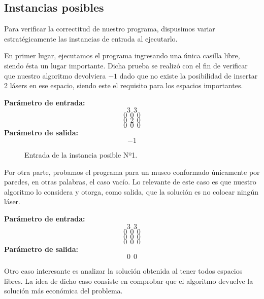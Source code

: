 \subsection{Instancias posibles}
Para verificar la correctitud de nuestro programa, dispusimos variar estratégicamente las instancias de entrada al ejecutarlo.
\begin{itemize}
\item En primer lugar, ejecutamos el programa ingresando una única casilla libre, siendo ésta un lugar importante. Dicha prueba se realizó con el fin de verificar que nuestro algoritmo devolviera $-1$ dado que no existe la posibilidad de insertar 2 lásers en ese espacio, siendo este el requisito para los espacios importantes.\newline

\textbf{Parámetro de entrada:} 
$$3\ \ 3$$
$$0\ \ 0\ \ 0$$
$$0\ \ 2\ \ 0$$
$$0\ \ 0\ \ 0$$
\textbf{Parámetro de salida:} $$-1$$\newline

\begin{center}
\begin{figure}[H] %
\begin{minipage}[t]{.45\textwidth}
\begin{center}
\caption{Entrada de la instancia posible Nº1.}
\end{center}
\label{fig-tc1}
\end{minipage}
\end{figure}
\item Por otra parte, probamos el programa para un museo conformado únicamente por paredes, en otras palabras, el caso vacío. Lo relevante de este caso es que nuestro algoritmo lo considera y otorga, como salida, que la solución es no colocar ningún láser.\newline
\end{center}

\textbf{Parámetro de entrada:} 
$$3\ \ 3$$
$$0\ \ 0\ \ 0$$
$$0\ \ 0\ \ 0$$
$$0\ \ 0\ \ 0$$
\textbf{Parámetro de salida:} $$0\ \ 0$$\newline
\item Otro caso interesante es analizar la solución obtenida al tener todos espacios libres. La idea de dicho caso consiste en comprobar que el algoritmo devuelve la solución más económica del problema.\newline


\end{itemize}
